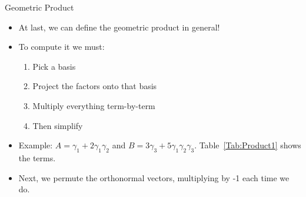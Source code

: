 \documentclass[aspectratio=169,xcolor=dvipsnames]{beamer}
\begin{document}
\begin{frame}{Geometric Product}


\begin{itemize}
      \item<only@1> At last, we can define the geometric product in general!
      \item<only@1> To compute it we must:
            \begin{enumerate}
                  \item Pick a basis
                  \item Project the factors onto that basis
                  \item Multiply everything term-by-term
                  \item Then simplify
            \end{enumerate}
      \item<only@1> Example: $A = \gamma_1 + 2\gamma_1\gamma_2$ and $B = 3\gamma_3 +5\gamma_1\gamma_2\gamma_3$.
            Table~\ref{Tab:Product1} shows the terms.
\setcounter{table}{2}
      \item<2> Next, we permute the orthonormal vectors, multiplying by -1 each time we do.




\end{itemize}
\end{frame}
\end{document}
